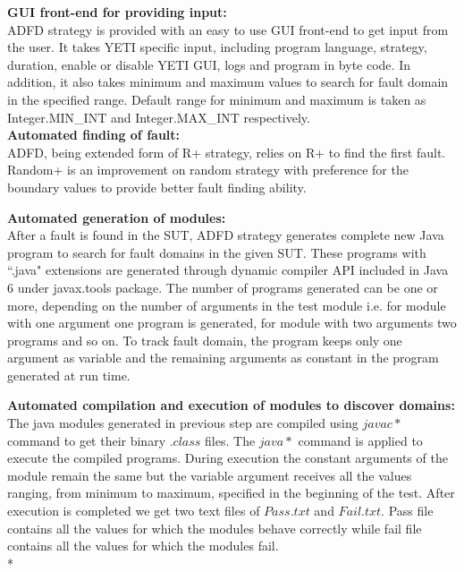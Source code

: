 \noindent \textbf{GUI front-end for providing input:}\\
ADFD strategy is provided with an easy to use GUI front-end to get input from the user. It takes YETI specific input, including program language, strategy, duration, enable or disable YETI GUI, logs and program in byte code. In addition, it also takes minimum and maximum values to search for fault domain in the specified range. Default range for minimum and maximum is taken as Integer.MIN\_INT and Integer.MAX\_INT respectively.\\

\noindent \textbf{Automated finding of fault:}\\
ADFD, being extended form of R+ strategy, relies on R+ to find the first fault. Random+ is an improvement on random strategy with preference for the boundary values to provide better fault finding ability. %

\noindent \textbf{Automated generation of modules:}\\
After a fault is found in the SUT, ADFD strategy generates complete new Java program to search for fault domains in the given SUT.  These programs with ``.java" extensions are generated through dynamic compiler API included in Java 6 under javax.tools package. The number of programs generated can be one or more, depending on the number of arguments in the test module i.e. for module with one argument one program is generated, for module with two arguments two programs and so on. To track fault domain, the program keeps only one argument as variable and the remaining arguments as constant in the program generated at run time.

\noindent \textbf{Automated compilation and execution of modules to discover domains:}\\
The java modules generated in previous step are compiled using $javac *$ command to get their binary $.class$ files. The $java *$ command is applied to execute the compiled programs. During execution the constant arguments of the module remain the same but the variable argument receives all the values ranging, from minimum to maximum, specified in the beginning of the test. After execution is completed we get two text files of $Pass.txt$ and $Fail.txt$. Pass file contains all the values for which the modules behave correctly while fail file contains all the values for which the modules fail.\\*

